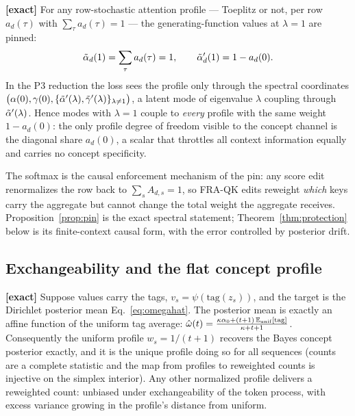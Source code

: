 \documentclass{article}
\begin{document}
\begin{prop}\label{prop:pin}
\textbf{[exact]} For any row-stochastic attention profile --- Toeplitz or not, per row $a_d(\tau)$ with $\sum_\tau a_d(\tau) = 1$ --- the generating-function values at $\lambda = 1$ are pinned:
\begin{equation}
    \Tilde{\alpha}_d(1) = \sum_\tau a_d(\tau) = 1, \qquad
    \Tilde{\alpha}'_d(1) = 1 - a_d(0) .
\end{equation}
In the P3 reduction the loss sees the profile only through the spectral coordinates $\big(\alpha(0), \gamma(0), \{\Tilde{\alpha}'(\lambda), \Tilde{\gamma}'(\lambda)\}_{\lambda\ne1}\big)$, a latent mode of eigenvalue $\lambda$ coupling through $\Tilde{\alpha}'(\lambda)$. Hence modes with $\lambda = 1$ couple to \emph{every} profile with the same weight $1 - a_d(0)$: the only profile degree of freedom visible to the concept channel is the diagonal share $a_d(0)$, a scalar that throttles all context information equally and carries no concept specificity.
\end{prop}

The softmax is the causal enforcement mechanism of the pin: any score edit renormalizes the row back to $\sum_s A_{d,s} = 1$, so FRA-QK edits reweight \emph{which} keys carry the aggregate but cannot change the total weight the aggregate receives. Proposition~\ref{prop:pin} is the exact spectral statement; Theorem~\ref{thm:protection} below is its finite-context causal form, with the error controlled by posterior drift.

\subsection{Exchangeability and the flat concept profile}

\begin{prop}\label{prop:flat}
\textbf{[exact]} Suppose values carry the tags, $v_s = \psi(\mathrm{tag}(z_s))$, and the target is the Dirichlet posterior mean Eq.~\eqref{eq:omegahat}. The posterior mean is exactly an affine function of the uniform tag average: $\hat{\omega}(t) = \frac{\kappa\alpha_0 + (t+1)\,\mathbb{E}_{\mathrm{unif}}[\mathrm{tag}]}{\kappa + t + 1}$. Consequently the uniform profile $w_s = 1/(t{+}1)$ recovers the Bayes concept posterior exactly, and it is the unique profile doing so for all sequences (counts are a complete statistic and the map from profiles to reweighted counts is injective on the simplex interior). Any other normalized profile delivers a reweighted count: unbiased under exchangeability of the token process, with excess variance growing in the profile's distance from uniform.
\end{prop}
\end{document}
